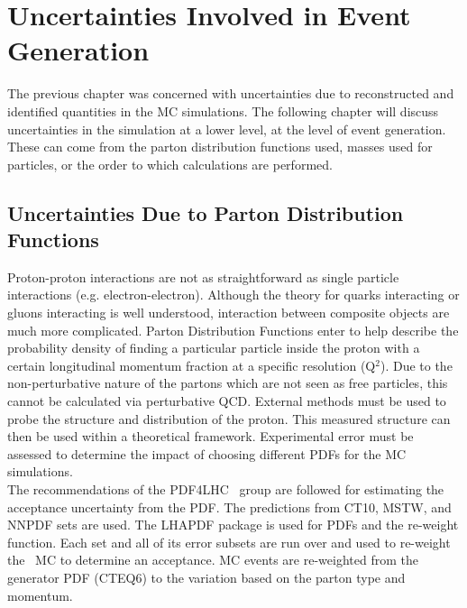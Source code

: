 \section{Uncertainties  Involved in Event Generation}
The previous chapter was concerned with uncertainties due to reconstructed and identified quantities in the MC simulations. The following chapter will discuss uncertainties in the simulation at a lower level, at the level of event generation. These can come from the parton distribution functions used, masses used for particles, or the order to which calculations are performed.\\ 

\subsection{Uncertainties Due to Parton Distribution Functions}	
Proton-proton interactions are not as straightforward as single particle interactions (e.g. electron-electron). Although the theory for quarks interacting or gluons interacting is well understood, interaction between composite objects are much more complicated. Parton Distribution Functions enter to help describe the probability density of finding a particular particle inside the proton with a certain longitudinal momentum fraction at a specific resolution (Q$^2$). Due to the non-perturbative nature of the partons which are not seen as free particles, this cannot be calculated via perturbative QCD. External methods must be used to probe the structure and distribution of the proton. This measured structure can then be used within a theoretical framework. Experimental error must be assessed to determine the impact of choosing different PDFs for the MC simulations.\\

The recommendations of the PDF4LHC~\cite{PDF4LHC} group are followed for estimating the acceptance uncertainty from the PDF. The predictions from CT10, MSTW, and NNPDF sets are used. The LHAPDF package is used for PDFs and the re-weight function. Each set and all of its error subsets are run over and used to re-weight the \ttZ \ MC to determine an acceptance. MC events are re-weighted from the generator PDF (CTEQ6) to the variation based on the parton type and momentum.\\

